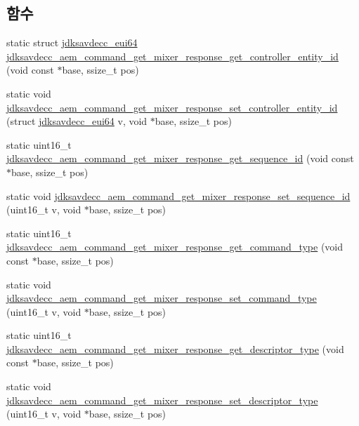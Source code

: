 \subsection*{함수}
\begin{DoxyCompactItemize}
\item 
static struct \hyperlink{structjdksavdecc__eui64}{jdksavdecc\+\_\+eui64} \hyperlink{group__command__get__mixer__response_gaa0d13f7b22117e98bf57893f416a741a}{jdksavdecc\+\_\+aem\+\_\+command\+\_\+get\+\_\+mixer\+\_\+response\+\_\+get\+\_\+controller\+\_\+entity\+\_\+id} (void const $\ast$base, ssize\+\_\+t pos)
\item 
static void \hyperlink{group__command__get__mixer__response_ga918bf35b83e279eaf92607d16fd3705e}{jdksavdecc\+\_\+aem\+\_\+command\+\_\+get\+\_\+mixer\+\_\+response\+\_\+set\+\_\+controller\+\_\+entity\+\_\+id} (struct \hyperlink{structjdksavdecc__eui64}{jdksavdecc\+\_\+eui64} v, void $\ast$base, ssize\+\_\+t pos)
\item 
static uint16\+\_\+t \hyperlink{group__command__get__mixer__response_ga64e32b5233fad739277dc2e7cd0733f6}{jdksavdecc\+\_\+aem\+\_\+command\+\_\+get\+\_\+mixer\+\_\+response\+\_\+get\+\_\+sequence\+\_\+id} (void const $\ast$base, ssize\+\_\+t pos)
\item 
static void \hyperlink{group__command__get__mixer__response_ga5a6802949dec5ca320f178a00518e6d7}{jdksavdecc\+\_\+aem\+\_\+command\+\_\+get\+\_\+mixer\+\_\+response\+\_\+set\+\_\+sequence\+\_\+id} (uint16\+\_\+t v, void $\ast$base, ssize\+\_\+t pos)
\item 
static uint16\+\_\+t \hyperlink{group__command__get__mixer__response_gaca655b7e19d95144abee869ed3b24893}{jdksavdecc\+\_\+aem\+\_\+command\+\_\+get\+\_\+mixer\+\_\+response\+\_\+get\+\_\+command\+\_\+type} (void const $\ast$base, ssize\+\_\+t pos)
\item 
static void \hyperlink{group__command__get__mixer__response_gaeae7fe6f4e80a8affee2c1973056bae8}{jdksavdecc\+\_\+aem\+\_\+command\+\_\+get\+\_\+mixer\+\_\+response\+\_\+set\+\_\+command\+\_\+type} (uint16\+\_\+t v, void $\ast$base, ssize\+\_\+t pos)
\item 
static uint16\+\_\+t \hyperlink{group__command__get__mixer__response_ga6b02459783e82a2dce9c62d2a67b37f6}{jdksavdecc\+\_\+aem\+\_\+command\+\_\+get\+\_\+mixer\+\_\+response\+\_\+get\+\_\+descriptor\+\_\+type} (void const $\ast$base, ssize\+\_\+t pos)
\item 
static void \hyperlink{group__command__get__mixer__response_ga24e18ece19fc7bf5f98a0cf219742f54}{jdksavdecc\+\_\+aem\+\_\+command\+\_\+get\+\_\+mixer\+\_\+response\+\_\+set\+\_\+descriptor\+\_\+type} (uint16\+\_\+t v, void $\ast$base, ssize\+\_\+t pos)

\end{DoxyCompactItemize}
